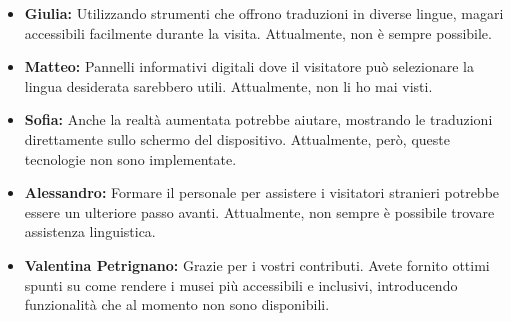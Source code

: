 \documentclass{article}
\begin{document}
\begin{itemize}
\item \textbf{Giulia:} Utilizzando strumenti che offrono traduzioni in diverse lingue, magari accessibili facilmente durante la visita. Attualmente, non è sempre possibile.

\item \textbf{Matteo:} Pannelli informativi digitali dove il visitatore può selezionare la lingua desiderata sarebbero utili. Attualmente, non li ho mai visti.

\item \textbf{Sofia:} Anche la realtà aumentata potrebbe aiutare, mostrando le traduzioni direttamente sullo schermo del dispositivo. Attualmente, però, queste tecnologie non sono implementate.

\item \textbf{Alessandro:} Formare il personale per assistere i visitatori stranieri potrebbe essere un ulteriore passo avanti. Attualmente, non sempre è possibile trovare assistenza linguistica.

\item \textbf{Valentina Petrignano:} Grazie per i vostri contributi. Avete fornito ottimi spunti su come rendere i musei più accessibili e inclusivi, introducendo funzionalità che al momento non sono disponibili.

\end{itemize}
\end{document}

